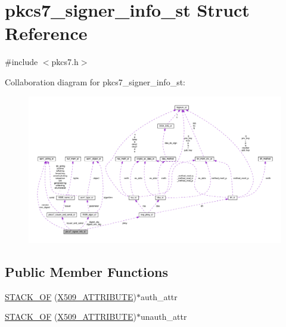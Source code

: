 \hypertarget{structpkcs7__signer__info__st}{}\section{pkcs7\+\_\+signer\+\_\+info\+\_\+st Struct Reference}
\label{structpkcs7__signer__info__st}


{\ttfamily \#include $<$pkcs7.\+h$>$}



Collaboration diagram for pkcs7\+\_\+signer\+\_\+info\+\_\+st\+:
\nopagebreak
\begin{figure}[H]
\begin{center}
\leavevmode
\includegraphics[width=350pt]{structpkcs7__signer__info__st__coll__graph}
\end{center}
\end{figure}
\subsection*{Public Member Functions}
\begin{DoxyCompactItemize}
\item 
\hyperlink{structpkcs7__signer__info__st_a3b91e56502966ae1bdf987264c22d354}{S\+T\+A\+C\+K\+\_\+\+OF} (\hyperlink{x509_8h_aa4f1a62a9d2dd8cb6780fe2713737c0f}{X509\+\_\+\+A\+T\+T\+R\+I\+B\+U\+TE})$\ast$auth\+\_\+attr
\item 
\hyperlink{structpkcs7__signer__info__st_abaa0f2abfc6e310a35f1093d01c4bb21}{S\+T\+A\+C\+K\+\_\+\+OF} (\hyperlink{x509_8h_aa4f1a62a9d2dd8cb6780fe2713737c0f}{X509\+\_\+\+A\+T\+T\+R\+I\+B\+U\+TE})$\ast$unauth\+\_\+attr
\end{DoxyCompactItemize}
